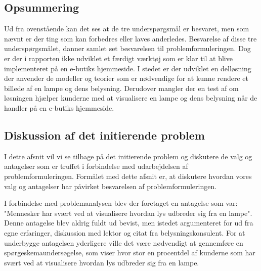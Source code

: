 \subsection*{Opsummering}
Ud fra ovenstående kan det ses at de tre underspørgsmål er besvaret, men som nævnt er der ting som kan forbedres eller laves anderledes. Besvarelse af disse tre underspørgsmålet, danner samlet set besvarelsen til problemformuleringen. Dog er der i rapporten ikke udviklet et færdigt værktøj som er klar til at blive implementeret på en e-butiks hjemmeside. I stedet er der udviklet en delløsning der anvender de modeller og teorier som er nødvendige for at kunne rendere et billede af en lampe og dens belysning. Derudover mangler der en test af om løsningen hjælper kunderne med at visualisere en lampe og dens belysning når de handler på en e-butiks hjemmeside. 


 \subsection{Diskussion af det initierende problem}

I dette afsnit vil vi se tilbage på det initierende problem og diskutere de valg og antagelser som er truffet i forbindelse med udarbejdelsen af problemformuleringen. Formålet med dette afsnit er, at diskutere hvordan vores valg og antagelser har påvirket besvarelsen af problemformuleringen. 

I forbindelse med problemanalysen blev der foretaget en antagelse som var: "Mennesker har svært ved at visualisere hvordan lys udbreder sig fra en lampe". Denne antagelse blev aldrig fuldt ud bevist, men istedet argumenteret for ud fra egne erfaringer, diskussion med lektor og citat fra belysningskonsulent. For at underbygge antagelsen yderligere ville det være nødvendigt at gennemføre en spørgeskemaundersøgelse, som viser hvor stor en procentdel af kunderne som har svært ved at visualisere hvordan lys udbreder sig fra en lampe. 

\clearpage